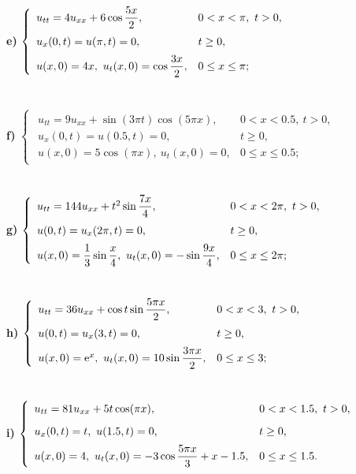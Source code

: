 \documentclass[10pt, a4paper]{article}
\begin{document}
	\textbf{e) }$\begin{cases}
		\begin{array}{ll}
			u_{tt}=4u_{xx}+6\cos\dfrac{5x}{2}, & 0<x<\pi,~t>0,\\
			\noalign{\vskip5pt}
			u_x(0,t)=u(\pi,t)=0, & t\ge0,\\
			\noalign{\vskip5pt}
			u(x,0)=4x,~u_t(x,0)=\cos\dfrac{3x}{2}, & 0\le x\le\pi;
		\end{array}
	\end{cases}$\\\\\\
	\textbf{f) }$\begin{cases}
		\begin{array}{ll}
			u_{tt}=9u_{xx}+\sin(3\pi t)\cos(5\pi x), & 0<x<0.5,~t>0,\\
			u_x(0,t)=u(0.5,t)=0, & t\ge0,\\
			u(x,0)=5\cos(\pi x),~u_t(x,0)=0, & 0\le x\le0.5;
		\end{array}
	\end{cases}$\\\\\\
	\textbf{g) }$\begin{cases}
		\begin{array}{ll}
			u_{tt}=144u_{xx}+t^2\sin\dfrac{7x}{4}, & 0<x<2\pi,~t>0,\\
			\noalign{\vskip5pt}
			u(0,t)=u_x(2\pi,t)=0, & t\ge0,\\
			\noalign{\vskip5pt}
			u(x,0)=\dfrac13\sin\dfrac x4,~u_t(x,0)=-\sin\dfrac{9x}{4}, & 0\le x\le2\pi;
		\end{array}
	\end{cases}$\\\\\\
	\textbf{h) }$\begin{cases}
		\begin{array}{ll}
			u_{tt}=36u_{xx}+\cos t\sin\dfrac{5\pi x}{2}, & 0<x<3,~t>0,\\
			\noalign{\vskip5pt}
			u(0,t)=u_x(3,t)=0, & t\ge0,\\
			\noalign{\vskip5pt}
			u(x,0)=\mathrm e^x,~u_t(x,0)=10\sin\dfrac{3\pi x}{2}, & 0\le x\le3;
		\end{array}
	\end{cases}$\\\\\\
	\textbf{i) }$\begin{cases}
		\begin{array}{ll}
			u_{tt}=81u_{xx}+5t\cos(\pi x), & 0<x<1.5,~t>0,\\
			\noalign{\vskip6pt}
			u_x(0,t)=t,~u(1.5,t)=0, & t\ge0,\\
			\noalign{\vskip5pt}
			u(x,0)=4,~u_t(x,0)=-3\cos\dfrac{5\pi x}{3}+x-1.5, & 0\le x\le1.5.
		\end{array}
	\end{cases}$
	\newpage
\end{document}
